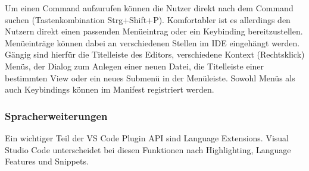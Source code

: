   Um einen Command aufzurufen können die Nutzer direkt nach dem Command suchen (Tastenkombination Strg+Shift+P).
  Komfortabler ist es allerdings den Nutzern direkt einen passenden Menüeintrag oder ein Keybinding
  bereitzustellen. Menüeinträge können dabei an verschiedenen Stellen im IDE eingehängt werden.
  Gängig sind hierfür die Titelleiste des Editors, verschiedene Kontext (Rechtsklick) Menüs, der Dialog
  zum Anlegen einer neuen Datei, die Titelleiste einer bestimmten View oder ein neues Submenü in der Menüleiste.
  Sowohl Menüs als auch Keybindings können im Manifest registriert werden.
\subsubsection{Spracherweiterungen}
  Ein wichtiger Teil der VS Code Plugin API sind Language Extensions. Visual Studio Code unterscheidet
  bei diesen Funktionen nach Highlighting, Language Features und Snippets.
